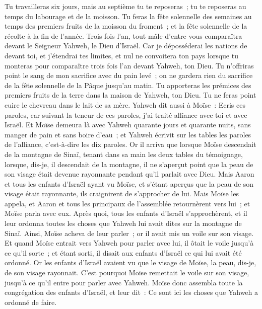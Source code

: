 \begin{multicols}{2}
Tu travailleras six jours, mais au septième tu te reposeras~; tu te reposeras au temps du labourage et de la moisson.
Tu feras la fête solennelle des semaines au temps des premiers fruits de la moisson du froment~; et la fête solennelle de la récolte à la fin de l'année.
Trois fois l'an, tout mâle d'entre vous comparaîtra devant le Seigneur Yahweh, le Dieu d'Israël.
Car je déposséderai les nations de devant toi, et j'étendrai tes limites, et nul ne convoitera ton pays lorsque tu monteras pour comparaître trois fois l'an devant Yahweh, ton Dieu.
Tu n'offriras point le sang de mon sacrifice avec du pain levé~; on ne gardera rien du sacrifice de la fête solennelle de la Pâque jusqu'au matin.
Tu apporteras les prémices des premiers fruits de la terre dans la maison de Yahweh, ton Dieu. Tu ne feras point cuire le chevreau dans le lait de sa mère.
Yahweh dit aussi à Moïse~: Ecris ces paroles, car suivant la teneur de ces paroles, j'ai traité alliance avec toi et avec Israël.
Et Moïse demeura là avec Yahweh quarante jours et quarante nuits, sans manger de pain et sans boire d'eau~; et Yahweh écrivit sur les tables les paroles de l'alliance, c'est-à-dire les dix paroles.
Or il arriva que lorsque Moïse descendait de la montagne de Sinaï, tenant dans sa main les deux tables du témoignage, lorsque, dis-je, il descendait de la montagne, il ne s'aperçut point que la peau de son visage était devenue rayonnante pendant qu'il parlait avec Dieu.
Mais Aaron et tous les enfants d'Israël ayant vu Moïse, et s'étant aperçus que la peau de son visage était rayonnante, ils craignirent de s'approcher de lui.
Mais Moïse les appela, et Aaron et tous les principaux de l'assemblée retournèrent vers lui~; et Moïse parla avec eux.
Après quoi, tous les enfants d'Israël s'approchèrent, et il leur ordonna toutes les choses que Yahweh lui avait dites sur la montagne de Sinaï.
Ainsi, Moïse acheva de leur parler~; or il avait mis un voile sur son visage.
Et quand Moïse entrait vers Yahweh pour parler avec lui, il ôtait le voile jusqu'à ce qu'il sorte~; et étant sorti, il disait aux enfants d'Israël ce qui lui avait été ordonné.
Or les enfants d'Israël avaient vu que le visage de Moïse, la peau, dis-je, de son visage rayonnait. C'est pourquoi Moïse remettait le voile sur son visage, jusqu'à ce qu'il entre pour parler avec Yahweh.
\VerseOne{}Moïse donc assembla toute la congrégation des enfants d'Israël, et leur dit~: Ce sont ici les choses que Yahweh a ordonné de faire.

\end{multicols}
